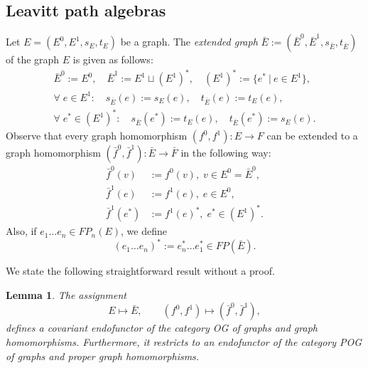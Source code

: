 \documentclass[12pt,times,a4paper]{amsart}
\newtheorem{lemma}[theorem]{Lemma}
\numberwithin{equation}{section}
\numberwithin{equation}{section}
\begin{document}
\subsection{Leavitt path algebras}
Let $E=(E^0,E^1,s_E,t_E)$ be a graph. The {\em extended graph} $\bar{E}:=(\bar{E}^0, \bar{E}^1,s_{\bar{E}},t_{\bar{E}})$
of the graph $E$ is given as follows:
\begin{gather}
\bar{E}^0:=E^0,\quad \bar{E}^1:=E^1\sqcup (E^1)^*,\quad (E^1)^*:=\{e^*~|~e\in E^1\},
\nonumber\\
\forall\; e\in E^1:\quad s_{\bar{E}}(e):=s_E(e),\quad t_{\bar{E}}(e):=t_E(e),
\nonumber\\
\forall\; e^*\in (E^1)^*:\quad s_{\bar{E}}(e^*):=t_E(e),\quad t_{\bar{E}}(e^*):=s_E(e).
\end{gather}
Observe that every graph homomorphism $(f^0,f^1)\colon E\to F$ can be extended to a graph homomorphism 
$(\bar{f}^0,\bar{f}^1)\colon\bar{E}\to\bar{F}$ in the following way:
\begin{align}
\bar{f}^0(v)&:=f^0(v),\; v\in E^0=\bar{E}^0,\nonumber\\ 
\bar{f}^1(e)&:=f^1(e),\; e\in E^0,\nonumber\\ 
\bar{f}^1(e^*)&:=f^1(e)^*,\; e^*\in (E^1)^*.
\end{align}
Also, if $e_1\ldots e_n\in FP_n(E)$, we define
\begin{equation}
(e_1\ldots e_n)^*:=e^*_n\ldots e_1^*\in FP(\bar{E}).
\end{equation}

We state the following straightforward result without a proof.
\begin{lemma}\label{extlem}
The assignment
\begin{equation*}
E\longmapsto \bar{E},\qquad (f^0,f^1)\longmapsto (\bar{f}^0,\bar{f}^1),
\end{equation*}
defines a covariant endofunctor of the category {\rm OG}
 of graphs and graph homomorphisms. Furthermore, it restricts to an endofunctor of the 
category {\rm POG} of graphs and proper graph homomorphisms.
\end{lemma}
\end{document}
